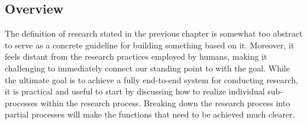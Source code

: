 




\subsection{Overview}


The definition of research stated in the previous chapter is somewhat too abstract to serve as a concrete guideline for building something based on it. Moreover, it feels distant from the research practices employed by humans, making it challenging to immediately connect our standing point to with the goal. While the ultimate goal is to achieve a fully end-to-end system for conducting research, it is practical and useful to start by discussing how to realize individual sub-processes within the research process. Breaking down the research process into partial processes will make the functions that need to be achieved much clearer.

